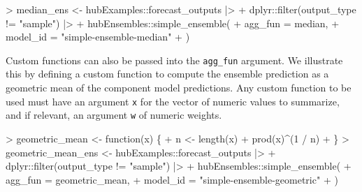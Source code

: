 \documentclass[
  letterpaper,
  DIV=11,
  numbers=noendperiod]{scrartcl}
\newenvironment{Shaded}{\begin{snugshade}}{\end{snugshade}}
\newcommand{\AttributeTok}[1]{\textcolor[rgb]{0.40,0.45,0.13}{#1}}
\newcommand{\ControlFlowTok}[1]{\textcolor[rgb]{0.00,0.23,0.31}{#1}}
\newcommand{\DecValTok}[1]{\textcolor[rgb]{0.68,0.00,0.00}{#1}}
\newcommand{\FunctionTok}[1]{\textcolor[rgb]{0.28,0.35,0.67}{#1}}
\newcommand{\NormalTok}[1]{\textcolor[rgb]{0.00,0.23,0.31}{#1}}
\newcommand{\OtherTok}[1]{\textcolor[rgb]{0.00,0.23,0.31}{#1}}
\newcommand{\SpecialCharTok}[1]{\textcolor[rgb]{0.37,0.37,0.37}{#1}}
\newcommand{\StringTok}[1]{\textcolor[rgb]{0.13,0.47,0.30}{#1}}
\begin{document}
\begin{Shaded}
\begin{Highlighting}[]
\SpecialCharTok{\textgreater{}}\NormalTok{ median\_ens }\OtherTok{\textless{}{-}}\NormalTok{ hubExamples}\SpecialCharTok{::}\NormalTok{forecast\_outputs }\SpecialCharTok{|\textgreater{}}
\SpecialCharTok{+}\NormalTok{   dplyr}\SpecialCharTok{::}\FunctionTok{filter}\NormalTok{(output\_type }\SpecialCharTok{!=} \StringTok{"sample"}\NormalTok{) }\SpecialCharTok{|\textgreater{}}
\SpecialCharTok{+}\NormalTok{   hubEnsembles}\SpecialCharTok{::}\FunctionTok{simple\_ensemble}\NormalTok{(}
\SpecialCharTok{+}     \AttributeTok{agg\_fun =}\NormalTok{ median,}
\SpecialCharTok{+}     \AttributeTok{model\_id =} \StringTok{"simple{-}ensemble{-}median"}
\SpecialCharTok{+}\NormalTok{   )}
\end{Highlighting}
\end{Shaded}

Custom functions can also be passed into the \texttt{agg\_fun} argument.
We illustrate this by defining a custom function to compute the ensemble
prediction as a geometric mean of the component model predictions. Any
custom function to be used must have an argument \texttt{x} for the
vector of numeric values to summarize, and if relevant, an argument
\texttt{w} of numeric weights.

\begin{Shaded}
\begin{Highlighting}[]
\SpecialCharTok{\textgreater{}}\NormalTok{ geometric\_mean }\OtherTok{\textless{}{-}} \ControlFlowTok{function}\NormalTok{(x) \{}
\SpecialCharTok{+}\NormalTok{   n }\OtherTok{\textless{}{-}} \FunctionTok{length}\NormalTok{(x)}
\SpecialCharTok{+}   \FunctionTok{prod}\NormalTok{(x)}\SpecialCharTok{\^{}}\NormalTok{(}\DecValTok{1} \SpecialCharTok{/}\NormalTok{ n)}
\SpecialCharTok{+}\NormalTok{ \}}
\SpecialCharTok{\textgreater{}}\NormalTok{ geometric\_mean\_ens }\OtherTok{\textless{}{-}}\NormalTok{ hubExamples}\SpecialCharTok{::}\NormalTok{forecast\_outputs }\SpecialCharTok{|\textgreater{}}
\SpecialCharTok{+}\NormalTok{   dplyr}\SpecialCharTok{::}\FunctionTok{filter}\NormalTok{(output\_type }\SpecialCharTok{!=} \StringTok{"sample"}\NormalTok{) }\SpecialCharTok{|\textgreater{}}
\SpecialCharTok{+}\NormalTok{   hubEnsembles}\SpecialCharTok{::}\FunctionTok{simple\_ensemble}\NormalTok{(}
\SpecialCharTok{+}     \AttributeTok{agg\_fun =}\NormalTok{ geometric\_mean,}
\SpecialCharTok{+}     \AttributeTok{model\_id =} \StringTok{"simple{-}ensemble{-}geometric"}
\SpecialCharTok{+}\NormalTok{   )}
\end{Highlighting}
\end{Shaded}
\end{document}

